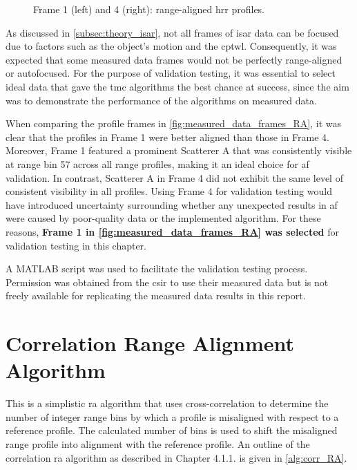 \documentclass[class=report,11pt,crop=false]{standalone}
\begin{document}
    \begin{figure}[H]
        \centering
        \begin{subfigure}{0.4\textwidth}
            \centering
            \resizebox{\linewidth}{!}{}
        \end{subfigure}
        \begin{subfigure}{0.4\textwidth}
            \centering
            \resizebox{\linewidth}{!}{} 
        \end{subfigure}
        \caption{Frame 1 (left) and 4 (right): range-aligned \gls{hrr} profiles.} \label{fig:measured_data_frames_RA}
    \end{figure}

    As discussed in \autoref{subsec:theory_isar}, not all frames of \gls{isar} data can be focused due to factors such as the object's motion and the \gls{cptwl}. Consequently, it was expected that some measured data frames would not be perfectly range-aligned or autofocused. For the purpose of validation testing, it was essential to select ideal data that gave the \gls{tmc} algorithms the best chance at success, since the aim was to demonstrate the performance of the algorithms on measured data.

    When comparing the profile frames in \autoref{fig:measured_data_frames_RA}, it was clear that the profiles in Frame 1 were better aligned than those in Frame 4. Moreover, Frame 1 featured a prominent Scatterer A that was consistently visible at range bin 57 across all range profiles, making it an ideal choice for \gls{af} validation. In contrast, Scatterer A in Frame 4 did not exhibit the same level of consistent visibility in all profiles. Using Frame 4 for validation testing would have introduced uncertainty surrounding whether any unexpected results in \gls{af} were caused by poor-quality data or the implemented algorithm. For these reasons, \textbf{Frame 1 in \autoref{fig:measured_data_frames_RA}  was selected} for validation testing in this chapter.

    A \textsc{MATLAB} script was used to facilitate the validation testing process. Permission was obtained from the \gls{csir} to use their measured data but is not freely available for replicating the measured data results in this report. 
\section{Correlation Range Alignment Algorithm}\label{subsec:corrRA}
This is a simplistic \gls{ra} algorithm that uses cross-correlation to determine the number of integer range bins by which a profile is misaligned with respect to a reference profile. The calculated number of bins is used to shift the misaligned range profile into alignment with the reference profile. An outline of the correlation \gls{ra} algorithm as described in Chapter 4.1.1. \cite{ISARtextbook_Martorella} is given in \autoref{alg:corr_RA}.
\end{document}
